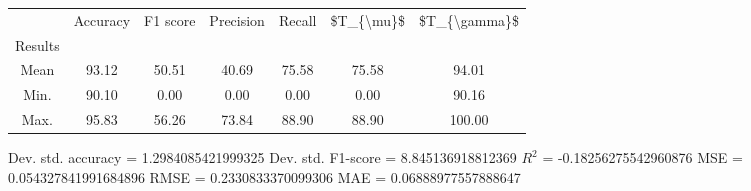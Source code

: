 \begin{tabular}{|c|c|c|c|c|c|c|}
\toprule
{} &  Accuracy &  F1 score &  Precision &  Recall &  \$T\_\{\textbackslash mu\}\$ &  \$T\_\{\textbackslash gamma\}\$ \\
Results &           &           &            &         &            &               \\
\hline
Mean    &     93.12 &     50.51 &      40.69 &   75.58 &      75.58 &         94.01 \\
Min.    &     90.10 &      0.00 &       0.00 &    0.00 &       0.00 &         90.16 \\
Max.    &     95.83 &     56.26 &      73.84 &   88.90 &      88.90 &        100.00 \\
\bottomrule
\end{tabular}

 Dev. std. accuracy = 1.2984085421999325
 Dev. std. F1-score = 8.845136918812369
 $R^2$ = -0.18256275542960876
 MSE = 0.054327841991684896
 RMSE = 0.2330833370099306
 MAE = 0.06888977557888647